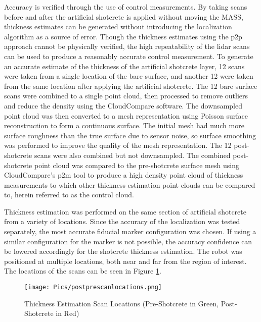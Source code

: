 Accuracy is verified through the use of control measurements. By taking scans before and after the artificial shotcrete is applied without moving the MASS, thickness estimates can be generated without introducing the localization algorithm as a source of error. Though the thickness estimates using the \acrshort{p2p} approach cannot be physically verified, the high repeatability of the \acrshort{lidar} scans can be used to produce a reasonably accurate control measurement. To generate an accurate estimate of the thickness of the artificial shotcrete layer, 12 scans were taken from a single location of the bare surface, and another 12 were taken from the same location after applying the artificial shotcrete. The 12 bare surface scans were combined to a single point cloud, then processed to remove outliers and reduce the density using the CloudCompare software. The downsampled point cloud was then converted to a mesh representation using Poisson surface reconstruction to form a continuous surface. The initial mesh had much more surface roughness than the true surface due to sensor noise, so surface smoothing was performed to improve the quality of the mesh representation. The 12 post-shotcrete scans were also combined but not downsampled. The combined post-shotcrete point cloud was compared to the pre-shotcrete surface mesh using CloudCompare's \acrshort{p2m} tool to produce a high density point cloud of thickness measurements to which other thickness estimation point clouds can be compared to, herein referred to as the control cloud.

Thickness estimation was performed on the same section of artificial shotcrete from a variety of locations. Since the accuracy of the localization was tested separately, the most accurate fiducial marker configuration was chosen. If using a similar configuration for the marker is not possible, the accuracy confidence can be lowered accordingly for the shotcrete thickness estimation. The robot was positioned at multiple locations, both near and far from the region of interest. The locations of the scans can be seen in Figure \ref{fig:thickscans}.\\

\begin{figure}[h]
    \centering
    \texttt{[image: Pics/postprescanlocations.png]}
    \caption{Thickness Estimation Scan Locations (Pre-Shotcrete in Green, Post-Shotcrete in Red)}
    \label{fig:thickscans}
\end{figure}

